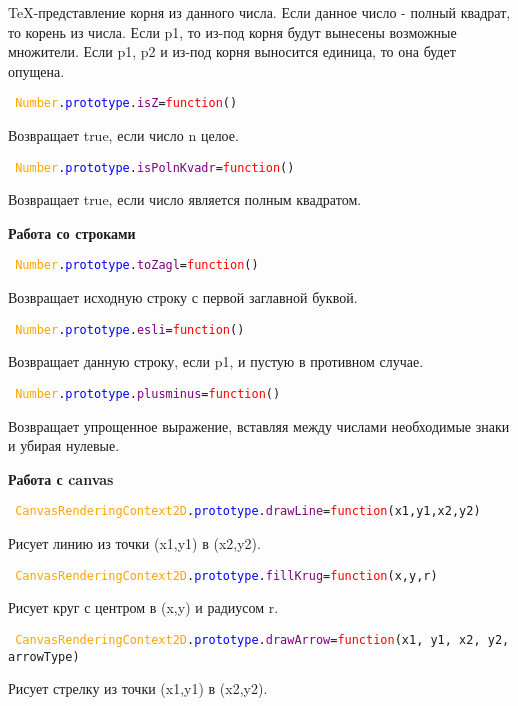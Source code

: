 TeX-представление корня из данного числа.
Если данное число - полный квадрат, то корень из числа.
Если p1, то из-под корня будут вынесены возможные множители.
Если p1, p2 и из-под корня выносится единица, то она будет опущена.

\texttt{
	\textcolor{Orange}{Number}.\textcolor{Blue}{prototype}.\textcolor{Purple}{isZ}=\textcolor{Red}{function}()
}

Возвращает true, если число n целое.

\texttt{
	\textcolor{Orange}{Number}.\textcolor{Blue}{prototype}.\textcolor{Purple}{isPolnKvadr}=\textcolor{Red}{function}()
}

Возвращает true, если число является полным квадратом.

\textbf{Работа со строками}

\hypertarget{toZagl}{\texttt{
		\textcolor{Orange}{Number}.\textcolor{Blue}{prototype}.\textcolor{Purple}{toZagl}=\textcolor{Red}{function}()
	}}

Возвращает исходную строку с первой заглавной буквой.

\texttt{
	\textcolor{Orange}{Number}.\textcolor{Blue}{prototype}.\textcolor{Purple}{esli}=\textcolor{Red}{function}()
}

Возвращает данную строку, если p1, и пустую в противном случае.

\texttt{
	\textcolor{Orange}{Number}.\textcolor{Blue}{prototype}.\textcolor{Purple}{plusminus}=\textcolor{Red}{function}()
}

Возвращает упрощенное выражение, вставляя между числами необходимые знаки и убирая нулевые.

\textbf{Работа с canvas}

\texttt{
	\textcolor{Orange}{CanvasRenderingContext2D}.\textcolor{Blue}{prototype}.\textcolor{Purple}{drawLine}=\textcolor{Red}{function}(x1,y1,x2,y2)
}

Рисует линию из точки (x1,y1) в (x2,y2).

\texttt{
	\textcolor{Orange}{CanvasRenderingContext2D}.\textcolor{Blue}{prototype}.\textcolor{Purple}{fillKrug}=\textcolor{Red}{function}(x,y,r)
}

Рисует круг с центром в (x,y) и радиусом r.

\texttt{
	\textcolor{Orange}{CanvasRenderingContext2D}.\textcolor{Blue}{prototype}.\textcolor{Purple}{drawArrow}=\textcolor{Red}{function}(x1, y1, x2, y2, arrowType)
}%

Рисует стрелку из точки (x1,y1) в (x2,y2).

